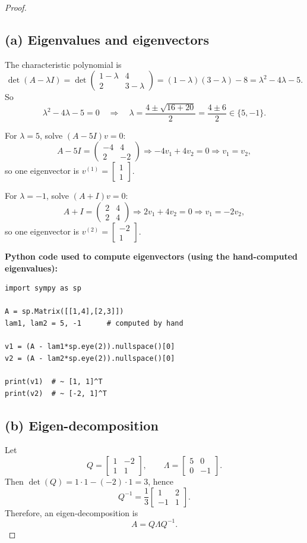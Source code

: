\documentclass[en,hazy,blue,12pt,normal]{elegantnote}
\begin{document}
\begin{proof}
    \subsection*{(a) Eigenvalues and eigenvectors}
The characteristic polynomial is
\[
\det(A-\lambda I)=
\det\begin{pmatrix}
1-\lambda & 4\\
2 & 3-\lambda
\end{pmatrix}
=(1-\lambda)(3-\lambda)-8
=\lambda^2-4\lambda-5.
\]
So
\[
\lambda^2-4\lambda-5=0
\quad\Rightarrow\quad
\lambda=\frac{4\pm\sqrt{16+20}}{2}
=\frac{4\pm 6}{2}
\in\{5,-1\}.
\]

For $\lambda=5$, solve $(A-5I)v=0$:
\[
A-5I=
\begin{pmatrix}
-4 & 4\\
2 & -2
\end{pmatrix}
\Rightarrow -4v_1+4v_2=0 \Rightarrow v_1=v_2,
\]
so one eigenvector is $v^{(1)}=\begin{bmatrix}1\\1\end{bmatrix}$.

For $\lambda=-1$, solve $(A+I)v=0$:
\[
A+I=
\begin{pmatrix}
2 & 4\\
2 & 4
\end{pmatrix}
\Rightarrow 2v_1+4v_2=0 \Rightarrow v_1=-2v_2,
\]
so one eigenvector is $v^{(2)}=\begin{bmatrix}-2\\1\end{bmatrix}$.

\textbf{Python code used to compute eigenvectors (using the hand-computed eigenvalues):}
\begin{verbatim}
import sympy as sp

A = sp.Matrix([[1,4],[2,3]])
lam1, lam2 = 5, -1      # computed by hand

v1 = (A - lam1*sp.eye(2)).nullspace()[0]
v2 = (A - lam2*sp.eye(2)).nullspace()[0]

print(v1)  # ~ [1, 1]^T
print(v2)  # ~ [-2, 1]^T
\end{verbatim}

\subsection*{(b) Eigen-decomposition}
Let
\[
Q=\begin{bmatrix} 1 & -2\\ 1 & 1\end{bmatrix},
\qquad
\Lambda=\begin{bmatrix}5&0\\0&-1\end{bmatrix}.
\]
Then $\det(Q)=1\cdot 1-(-2)\cdot 1=3$, hence
\[
Q^{-1}=\frac{1}{3}\begin{bmatrix}1&2\\-1&1\end{bmatrix}.
\]
Therefore, an eigen-decomposition is
\[
A = Q\Lambda Q^{-1}.
\]


\end{proof}
\end{document}
